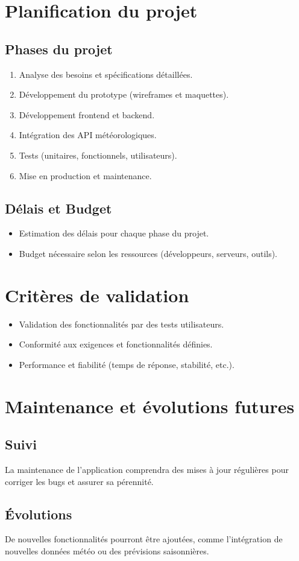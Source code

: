 \documentclass[a4paper,12pt]{article}
\begin{document}
\section{Planification du projet}
\subsection{Phases du projet}
\begin{enumerate}
    \item Analyse des besoins et spécifications détaillées.
    \item Développement du prototype (wireframes et maquettes).
    \item Développement frontend et backend.
    \item Intégration des API météorologiques.
    \item Tests (unitaires, fonctionnels, utilisateurs).
    \item Mise en production et maintenance.
\end{enumerate}

\subsection{Délais et Budget}
\begin{itemize}
    \item Estimation des délais pour chaque phase du projet.
    \item Budget nécessaire selon les ressources (développeurs, serveurs, outils).
\end{itemize}

\section{Critères de validation}
\begin{itemize}
    \item Validation des fonctionnalités par des tests utilisateurs.
    \item Conformité aux exigences et fonctionnalités définies.
    \item Performance et fiabilité (temps de réponse, stabilité, etc.).
\end{itemize}

\section{Maintenance et évolutions futures}
\subsection{Suivi}
La maintenance de l'application comprendra des mises à jour régulières pour corriger les bugs et assurer sa pérennité.

\subsection{Évolutions}
De nouvelles fonctionnalités pourront être ajoutées, comme l'intégration de nouvelles données météo ou des prévisions saisonnières.
\end{document}
